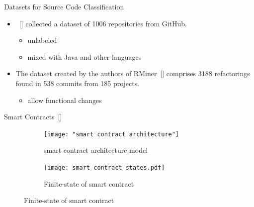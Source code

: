 \documentclass[xcolor=svgnames]{beamer}
\begin{document}
\begin{frame}{Datasets for Source Code Classification}
\begin{itemize}
\item {}~[] collected a dataset of \num{1006} repositories from GitHub.
\begin{itemize}
\item unlabeled
\item mixed with Java and other languages
\end{itemize}

\item The dataset created by the authors of RMiner~[] comprises \num{3188} refactorings found in 538 commits from 185 projects.
\begin{itemize}
\item allow functional changes
\end{itemize}
\end{itemize}

\end{frame}



\begin{frame}{Smart Contracts~[]}

\begin{figure}
\centering
\begin{subfigure}[T]{0.3\textwidth}
	\texttt{[image: "smart contract architecture"]}
	\caption{smart contract architecture model}
\end{subfigure}
\hfill
\begin{subfigure}[T]{0.65\textwidth}
	\texttt{[image: smart contract states.pdf]}
	\caption{Finite-state of smart contract}
\end{subfigure}
\end{figure}


\end{frame}


\end{document}
